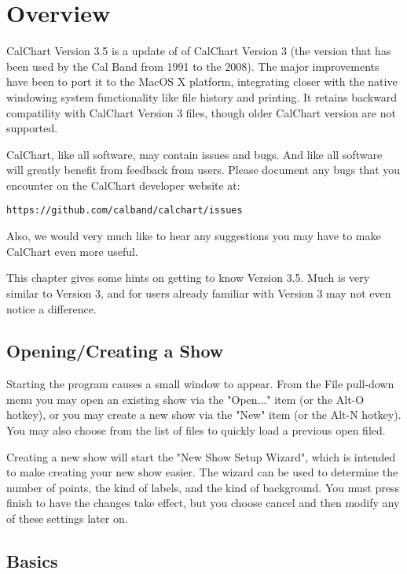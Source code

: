\chapter{Overview}\label{overview}

CalChart Version 3.5 is a update of of CalChart Version 3 (the version that has been used by the Cal Band from 1991 to the 2008).  The major improvements have been to port it to the MacOS X platform, integrating closer with the native windowing system functionality like file history and printing. It retains backward compatility with CalChart Version 3 files, though older CalChart version are not supported.

CalChart, like all software, may contain issues and bugs.  And like all software will greatly benefit from feedback from users.  Please document any bugs that you encounter on the CalChart developer website at:

\begin{verbatim}
https://github.com/calband/calchart/issues
\end{verbatim}

Also, we would very much like to hear any suggestions you may have to make CalChart even more useful.

This chapter gives some hints on getting to know Version 3.5.  Much is very similar to Version 3, and for users already familiar with Version 3 may not even notice a difference.

\section{Opening/Creating a Show}\label{newshow}

Starting the program causes a small window to appear.  From the File pull-down menu you may open an existing show via the "Open..." item (or the Alt-O hotkey), or you may create a new show via the "New" item (or the Alt-N hotkey).  You may also choose from the list of files to quickly load a previous open filed.

Creating a new show will start the "New Show Setup Wizard", which is intended to make creating your new show easier.  The wizard can be used to determine the number of points, the kind of labels, and the kind of background.  You must press finish to have the changes take effect, but you choose cancel and then modify any of these settings later on.

\section{Basics}\label{basics}

